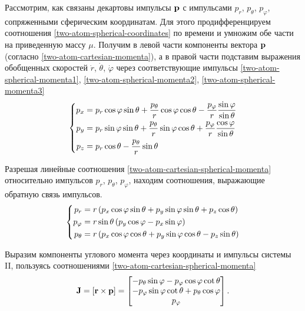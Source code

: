 Рассмотрим, как связаны декартовы импульсы $\mathbf{p}$ с импульсами $p_r$, $p_\theta$, $p_\varphi$, сопряженными сферическим координатам. Для этого продифференцируем соотношения \eqref{two-atom-spherical-coordinates} по времени и умножим обе части на приведенную массу $\mu$. Получим в левой части компоненты вектора $\mathbf{p}$ (согласно \eqref{two-atom-cartesian-momenta}), а в правой части подставим выражения обобщенных скоростей $\dot{r}$, $\dot{\theta}$, $\dot{\varphi}$ через соответствующие импульсы \eqref{two-atom-spherical-momenta1}, \eqref{two-atom-spherical-momenta2}, \eqref{two-atom-spherical-momenta3}
\begin{gather}
    \left\{ 
    \begin{aligned}
        p_x &= p_r \cos \varphi \sin \theta + \frac{p_\theta}{r} \cos \varphi \cos \theta - \frac{p_\varphi}{r} \frac{\sin \varphi}{\sin \theta} \\ 
        p_y &= p_r \sin \varphi \sin \theta + \frac{p_\theta}{r} \sin \varphi \cos \theta + \frac{p_\varphi}{r} \frac{\cos \varphi}{\sin \theta} \\ 
        p_z &= p_r \cos \theta - \frac{p_\theta}{r} \sin \theta 
    \end{aligned}
    \right. \label{two-atom-cartesian-spherical-momenta}
\end{gather}

Разрешая линейные соотношения \eqref{two-atom-cartesian-spherical-momenta} относительно импульсов $p_r$, $p_\theta$, $p_\varphi$, находим соотношения, выражающие обратную связь импульсов.
\begin{gather}
    \left\{
    \begin{aligned}
        p_r &= r \left( p_x \cos \varphi \sin \theta + p_y \sin \varphi \sin \theta + p_z \cos \theta \right)\\
        p_\varphi &= r \sin \theta \left( p_y \cos \varphi - p_x \sin \varphi \right) \\
        p_\theta &= r \left( p_x \cos \varphi \cos \theta + p_y \sin \varphi \cos \theta - p_z \sin \theta \right)  
    \end{aligned}
    \right.
\end{gather}

Выразим компоненты углового момента через координаты и импульсы системы II, пользуясь соотношениями \eqref{two-atom-cartesian-spherical-momenta}
\begin{gather}
    \mathbf{J} = \left[ \mathbf{r} \times \mathbf{p} \right] = 
    \begin{bmatrix}
        -p_\theta \sin \varphi - p_\varphi \cos \varphi \cot \theta \\
        -p_\varphi \sin \varphi \cot \theta + p_\theta \cos \varphi \\
        p_\varphi
    \end{bmatrix}. \label{two-atom-angular-momenta-spherical} 
\end{gather}


